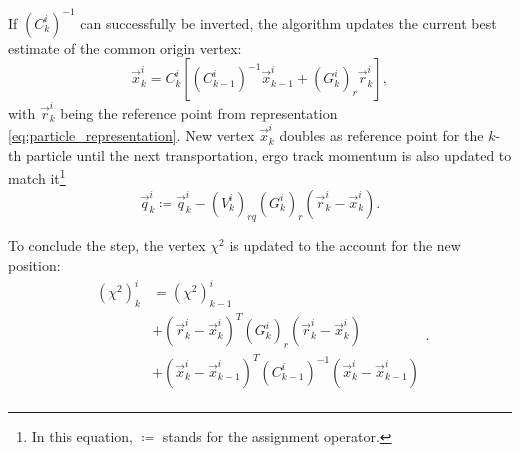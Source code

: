 

If ${(C^i_k)}^{-1}$ can successfully be inverted, the algorithm updates the current best estimate of the common origin vertex:
\begin{equation}
\vec{x}_k^i = C_k^i \left[
	{(C^i_{k-1})}^{-1} \vec{x}_{k-1}^i
	+ {(G_k^i)}_r \vec{r}_k^i
\right],
\label{eq:VF_new_vertex_final}
\end{equation}
with $\vec{r}_k^i$ being the reference point from representation \eqref{eq:particle_representation}.
New vertex $\vec{x}_k^i$ doubles as reference point for the $k$-th particle until the next transportation, ergo track momentum is also updated to match it\footnote{In this equation, $\coloneqq$ stands for the assignment operator.}
\begin{equation}
	\vec{q}_k^i \coloneqq
	\vec{q}_k^i
	-
	{(V_k^i)}_{rq}
	{(G_k^i)}_r
	\left(
		\vec{r}_k^i - \vec{x}_k^i
	\right).
	\label{eq:VF_momentum_final}
\end{equation}

To conclude the step, the vertex $\chi^2$ is updated to the account for the new position:
\begin{equation}
\begin{aligned}
	{(\chi^2)}_k^i &= {(\chi^2)}_{k-1}^i \\
	&+
	{\left(\vec{r}_{k}^i - \vec{x}_k^i\right)}^T  {(G_k^i)}_r \left(\vec{r}_{k}^i - \vec{x}_k^i \right) \\
	&+
	{\left(\vec{x}_k^i - \vec{x}_{k-1}^i\right)}^T  {(C_{k-1}^i)}^{-1} \left(\vec{x}_k^i - \vec{x}_{k-1}^i\right) \\
\end{aligned}.
\label{eq:VF_vertex_chi2_final}
\end{equation}

